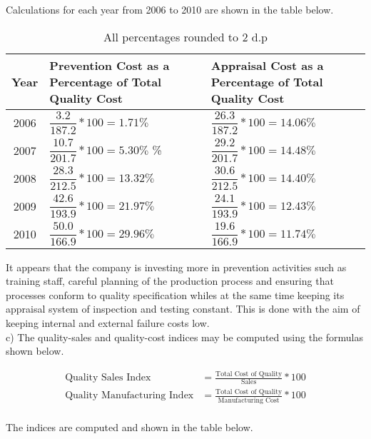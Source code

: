\documentclass[12pt]{article}
\begin{document}
Calculations for each year from 2006 to 2010 are shown in the table below.

	\begin{table}[h]
	\begin{center}
	\begin{tabular}{c|m{3in}|m{3in}}
		\hline
		Year & Prevention Cost as a Percentage of Total Quality Cost & Appraisal Cost as a Percentage of Total Quality Cost \\ 
		\hline
		2006 & $\dfrac{3.2}{187.2} * 100 = 1.71\% $ 
		& $\dfrac{26.3}{187.2} * 100 = 14.06\%$ \\ 
		\hline 
		2007 & $\dfrac{10.7}{201.7} * 100 = 5.30\%$ \% 
		& $\dfrac{29.2}{201.7} * 100 = 14.48\%$\\ 
		\hline
		2008 & $\dfrac{28.3}{212.5} * 100 = 13.32\%$  
		& $\dfrac{30.6}{212.5} * 100 = 14.40\%$\\  
		\hline
		2009 & $\dfrac{42.6}{193.9} * 100 = 21.97\%$  
		& $\dfrac{24.1}{193.9} * 100 = 12.43\%$\\ 
		\hline
		2010 & $\dfrac{50.0}{166.9} * 100 = 29.96\% $  
		& $\dfrac{19.6}{166.9} * 100 = 11.74\%$ \\ 
		\hline
	\end{tabular}
	\caption{All percentages rounded to 2 d.p}
	\end{center}
	\end{table}	

It appears that the company is investing more in prevention activities such as training staff, careful planning of the production process and ensuring that processes conform to quality specification whiles at the same time keeping its appraisal system of inspection and testing constant. This is done with the aim of keeping internal and external failure costs low.\\

c) The quality-sales and quality-cost indices may be computed using the formulas shown below.

	\begin{align*}
		\text{Quality Sales Index} &= \frac{\text{Total Cost of Quality}}{\text{Sales}} * 100\\
		\text{Quality Manufacturing Index} &= \frac{\text{Total Cost of Quality}}{\text{Manufacturing Cost}} * 100\\
	\end{align*}
	
	The indices are computed and shown in the table below.
	
\end{document}
